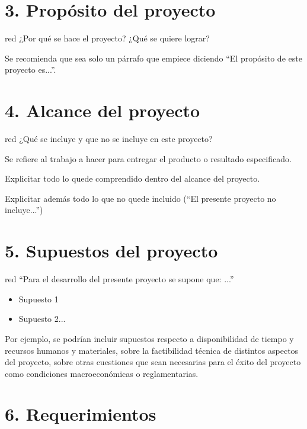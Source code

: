 \documentclass[
11pt, %
codirector, %
]{charter}
\begin{document}
\section{3. Propósito del proyecto}
\label{sec:proposito}

\begin{consigna}{red}
¿Por qué se hace el proyecto? ¿Qué se quiere lograr? 

Se recomienda que sea solo un párrafo que empiece diciendo ``El propósito de este proyecto es...''.
\end{consigna}

\section{4. Alcance del proyecto}
\label{sec:alcance}

\begin{consigna}{red}
¿Qué se incluye y que no se incluye en este proyecto?

Se refiere al trabajo a hacer para entregar el producto o resultado especificado. 

Explicitar todo lo quede comprendido dentro del alcance del proyecto.

Explicitar además todo lo que no quede incluido (``El presente proyecto no incluye...'')

\end{consigna}


\section{5. Supuestos del proyecto}
\label{sec:supuestos}

\begin{consigna}{red}
``Para el desarrollo del presente proyecto se supone que: ...''

\begin{itemize}
	\item Supuesto 1
	\item Supuesto 2...
\end{itemize}

Por ejemplo, se podrían incluir supuestos respecto a disponibilidad de tiempo y recursos humanos y materiales, sobre la factibilidad técnica de distintos aspectos del proyecto, sobre otras cuestiones que sean necesarias para el éxito del proyecto como condiciones macroeconómicas o reglamentarias.
\end{consigna}

\section{6. Requerimientos}
\label{sec:requerimientos}
\end{document}
